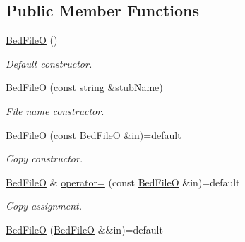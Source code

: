 \subsection*{Public Member Functions}
\begin{DoxyCompactItemize}
\item 
\mbox{\label{classsamp_files_1_1_bed_file_o_aebdfbb617b52a61a97591b37ccbb7f0a}} 
\hyperlink{classsamp_files_1_1_bed_file_o_aebdfbb617b52a61a97591b37ccbb7f0a}{Bed\+FileO} ()
\begin{DoxyCompactList}\small\item\em Default constructor. \end{DoxyCompactList}\item 
\hyperlink{classsamp_files_1_1_bed_file_o_a0abab96a74b4f8d92d85dbd147e7a9ae}{Bed\+FileO} (const string \&stub\+Name)
\begin{DoxyCompactList}\small\item\em File name constructor. \end{DoxyCompactList}\item 
\mbox{\label{classsamp_files_1_1_bed_file_o_a68243fc4f91042a5de691c5c3ed833d4}} 
\hyperlink{classsamp_files_1_1_bed_file_o_a68243fc4f91042a5de691c5c3ed833d4}{Bed\+FileO} (const \hyperlink{classsamp_files_1_1_bed_file_o}{Bed\+FileO} \&in)=default
\begin{DoxyCompactList}\small\item\em Copy constructor. \end{DoxyCompactList}\item 
\mbox{\label{classsamp_files_1_1_bed_file_o_a3e0239d1721dc5ae7232e248dfbd43a5}} 
\hyperlink{classsamp_files_1_1_bed_file_o}{Bed\+FileO} \& \hyperlink{classsamp_files_1_1_bed_file_o_a3e0239d1721dc5ae7232e248dfbd43a5}{operator=} (const \hyperlink{classsamp_files_1_1_bed_file_o}{Bed\+FileO} \&in)=default
\begin{DoxyCompactList}\small\item\em Copy assignment. \end{DoxyCompactList}\item 
\mbox{\label{classsamp_files_1_1_bed_file_o_aa441eeb64a48884637b3004a98b5abc5}} 
\hyperlink{classsamp_files_1_1_bed_file_o_aa441eeb64a48884637b3004a98b5abc5}{Bed\+FileO} (\hyperlink{classsamp_files_1_1_bed_file_o}{Bed\+FileO} \&\&in)=default

\end{DoxyCompactItemize}
